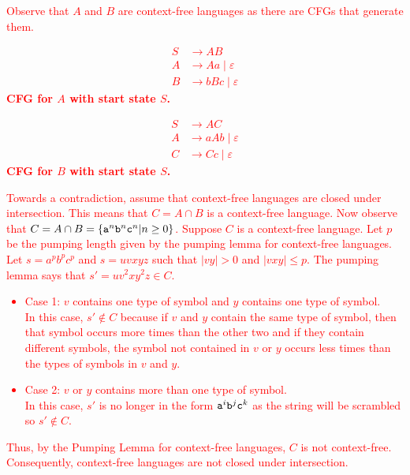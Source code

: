 \textcolor{red}{
Observe that $A$ and $B$ are context-free languages as there are CFGs that generate them.
\begin{center}
    \begin{minipage}{0.4\textwidth}
        \begin{align*}
            S &\rightarrow AB \\
            A &\rightarrow Aa \mid \varepsilon \\
            B &\rightarrow bBc \mid \varepsilon
        \end{align*}
        \centering
        \textbf{CFG for $A$ with start state $S$.}
    \end{minipage}
    \hfill
    \begin{minipage}{0.4\textwidth}
        \begin{align*}
            S &\rightarrow AC \\
            A &\rightarrow aAb \mid \varepsilon \\
            C &\rightarrow Cc \mid \varepsilon
        \end{align*}
        \centering
        \textbf{CFG for $B$ with start state $S$.}
    \end{minipage}
\end{center}
Towards a contradiction, assume that context-free languages are closed under intersection. This means that $C = A \cap B$ is a context-free language.\newp
Now observe that $C = A \cap B = \{\texttt{a}^n\texttt{b}^n\texttt{c}^n|n \geq 0\}$. Suppose $C$ is a context-free language. Let $p$ be the pumping length given by the pumping lemma for context-free languages. Let $s=a^pb^pc^p$ and $s=uvxyz$ such that $|vy|>0$ and $|vxy| \leq p$. The pumping lemma says that $s'=uv^2xy^2z \in C$.
\begin{itemize}
    \item [] Case 1: $v$ contains one type of symbol and $y$ contains one type of symbol.\\
    In this case, $s' \notin C$ because if $v$ and $y$ contain the same type of symbol, then that symbol occurs more times than the other two and if they contain different symbols, the symbol not contained in $v$ or $y$ occurs less times than the types of symbols in $v$ and $y$.
    \item [] Case 2: $v$ or $y$ contains more than one type of symbol.\\
    In this case, $s'$ is no longer in the form $\texttt{a}^i\texttt{b}^j\texttt{c}^k$ as the string will be scrambled so $s' \notin C$.
\end{itemize}
Thus, by the Pumping Lemma for context-free languages, $C$ is not context-free. Consequently, context-free languages are not closed under intersection.
}
